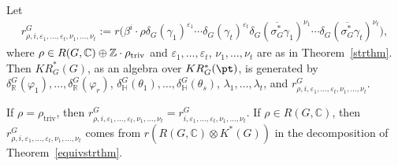 \begin{Corollary}
\label{eqmodgenerators}
Let
\begin{gather*}
r^G_{\rho, i, \varepsilon_1, \dots, \varepsilon_t, \nu_1, \dots,\nu_t}
:=r\big(\beta^i\cdot\rho\delta_G(\gamma_1)^{\varepsilon_1}\cdots\delta_G(\gamma_t)^{\varepsilon_t}\delta_G(\overline{\sigma_G^*}
\gamma_1)^{\nu_1}\cdots\delta_G(\overline{\sigma_G^*}
\gamma_t)^{\nu_t}\big),
\end{gather*}
where $\rho\in R(G, \mathbb{C})\oplus \mathbb{Z}\cdot\rho_{\text{\rm triv}}$ and $\varepsilon_1, \dots, \varepsilon_t$,
$\nu_1, \dots, \nu_t$ are as in Theorem~{\rm \ref{strthm}}.
Then $KR_G^*(G)$, as an algebra over $KR_G^*(\pt)$, is generated by $\delta_\mathbb{R}^G(\varphi_1), \dots,
\delta_\mathbb{R}^G(\varphi_r)$, $\delta_\mathbb{H}^G(\theta_1), \dots, \delta_\mathbb{H}^G(\theta_s)$, $\lambda_1, \dots,
\lambda_t$, and $r^G_{\rho, i, \varepsilon_1, \dots, \varepsilon_t, \nu_1, \dots, \nu_t}$.
\end{Corollary}
\begin{Remark}
If $\rho=\rho_{\text{triv}}$, then $r^G_{\rho, i, \varepsilon_1, \dots, \varepsilon_t, \nu_1, \dots, \nu_t}=r^G_{i,
\varepsilon_1, \dots, \varepsilon_t, \nu_1, \dots, \nu_t}$.
If $\rho\in R(G, \mathbb{C})$, then $r^G_{\rho, i, \varepsilon_1, \dots, \varepsilon_t, \nu_1, \dots, \nu_t}$ comes from
$r(R(G, \mathbb{C})\otimes K^*(G))$ in the decomposition of Theorem~\ref{equivstrthm}.
\end{Remark}

